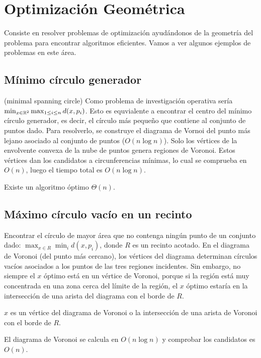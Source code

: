 \documentclass[TGyGC.tex]{subfiles}
\begin{document}
\chapter{Optimización Geométrica}
Consiste en resolver problemas de optimización ayudándonos de la geometría del problema para encontrar algoritmos eficientes. Vamos a ver algunos ejemplos de problemas en este área.

\section{Mínimo círculo generador}
(minimal spanning circle) Como problema de investigación operativa sería $\min_{x\in\mathbb{R}^2}\max_{1\leq i\leq n} d(x,p_i)$. Esto es equvialente a encontrar el centro del mínimo círculo generador, es decir, el círculo más pequeño que contiene al conjunto de puntos dado. Para resolverlo, se construye el diagrama de Vornoi del punto más lejano asociado al conjunto de puntos ($O(n\log n)$). Solo los vértices de la envolvente convexa de la nube de puntos genera regiones de Voronoi. Estos vértices dan los candidatos a circunferencias mínimas, lo cual se comprueba en $O(n)$, luego el tiempo total es $O(n\log n)$. 

Existe un algoritmo óptimo $\Theta(n)$.

\section{Máximo círculo vacío en un recinto}
Encontrar el círculo de mayor área que no contenga ningún punto de un conjunto dado: $\max_{x\in R}\min_i d(x,p_i)$, donde $R$ es un recinto acotado. En el diagrama de Voronoi (del punto más cercano), los vértices del diagrama determinan círculos vacíos asociados a los puntos de las tres regiones incidentes. Sin embargo, no siempre el $x$ óptimo está en un vértice de Voronoi, porque si la región está muy concentrada en una zona cerca del límite de la región, el $x$ óptimo estaría en la intersección de una arista del diagrama con el borde de $R$. 

\begin{prop}
$x$ es un vértice del diagrama de Voronoi o la intersección de una arista de Voronoi con el borde de $R$. 
\end{prop}

El diagrama de Voronoi se calcula en $O(n\log n)$ y comprobar los candidatos es $O(n)$. 
\end{document}
